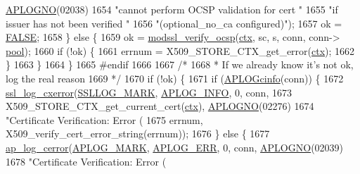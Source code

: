\begin{DoxyCode}
{{{      \hyperlink{group__APACHE__CORE__LOG_ga1dee8a07e06bc5b3de8b89662c2cd666}{APLOGNO}(02038)
1654                           \textcolor{stringliteral}{"cannot perform OCSP validation for cert "}
1655                           \textcolor{stringliteral}{"if issuer has not been verified "}
1656                           \textcolor{stringliteral}{"(optional\_no\_ca configured)"});
1657             ok = \hyperlink{group__MOD__SSL__PRIVATE_gaa93f0eb578d23995850d61f7d61c55c1}{FALSE};
1658         \} \textcolor{keywordflow}{else} \{
1659             ok = \hyperlink{group__MOD__SSL__PRIVATE_ga57e74c03fc5018459fa3ec21aac9efaf}{modssl\_verify\_ocsp}(\hyperlink{group__APACHE__CORE__FILTER_ga94af791485570bea922969fef12d6259}{ctx}, sc, s, conn, conn->
      \hyperlink{structconn__rec_a1dc5f31c7afc4a6f9c4ede0daea8cd1d}{pool});
1660             \textcolor{keywordflow}{if} (!ok) \{
1661                 errnum = X509\_STORE\_CTX\_get\_error(\hyperlink{group__APACHE__CORE__FILTER_ga94af791485570bea922969fef12d6259}{ctx});
1662             \}
1663         \}
1664     \}
1665 \textcolor{preprocessor}{#endif}
1666 
1667     \textcolor{comment}{/*}
1668 \textcolor{comment}{     * If we already know it's not ok, log the real reason}
1669 \textcolor{comment}{     */}
1670     \textcolor{keywordflow}{if} (!ok) \{
1671         \textcolor{keywordflow}{if} (\hyperlink{group__APACHE__CORE__LOG_gaef65005964c48b847c32226d786a430d}{APLOGcinfo}(conn)) \{
1672             \hyperlink{ssl__engine__log_8c_a8b3daba5c2e98cd341fc74c6200be95f}{ssl\_log\_cxerror}(\hyperlink{group__MOD__SSL__PRIVATE_ga0e50481cba5952ce59ad2c103f8128a4}{SSLLOG\_MARK}, \hyperlink{group__APACHE__CORE__LOG_ga47fafbef7e478babdd92e90407f95b19}{APLOG\_INFO}, 0, conn,
1673                             X509\_STORE\_CTX\_get\_current\_cert(\hyperlink{group__APACHE__CORE__FILTER_ga94af791485570bea922969fef12d6259}{ctx}), \hyperlink{group__APACHE__CORE__LOG_ga1dee8a07e06bc5b3de8b89662c2cd666}{APLOGNO}(02276)
1674                             \textcolor{stringliteral}{"Certificate Verification: Error (%
1675                             errnum, X509\_verify\_cert\_error\_string(errnum));
1676         \} \textcolor{keywordflow}{else} \{
1677             \hyperlink{group__APACHE__CORE__LOG_ga60ef6919b8e1b691b0c1ac4d67c9449f}{ap\_log\_cerror}(\hyperlink{group__APACHE__CORE__LOG_ga655e126996849bcb82e4e5a14c616f4a}{APLOG\_MARK}, \hyperlink{group__APACHE__CORE__LOG_ga57ad94ed8c92c4306de90479251a5d58}{APLOG\_ERR}, 0, conn, 
      \hyperlink{group__APACHE__CORE__LOG_ga1dee8a07e06bc5b3de8b89662c2cd666}{APLOGNO}(02039)
1678                           \textcolor{stringliteral}{"Certificate Verification: Error (%
}}}}}
\end{DoxyCode}
